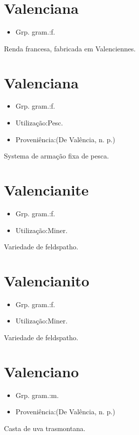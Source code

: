 \documentclass{article}
\begin{document}
\section{Valenciana}
\begin{itemize}
\item {Grp. gram.:f.}
\end{itemize}
Renda francesa, fabricada em Valenciennes.
\section{Valenciana}
\begin{itemize}
\item {Grp. gram.:f.}
\end{itemize}
\begin{itemize}
\item {Utilização:Pesc.}
\end{itemize}
\begin{itemize}
\item {Proveniência:(De \textunderscore Valência\textunderscore , n. p.)}
\end{itemize}
Systema de armação fixa de pesca.
\section{Valencianite}
\begin{itemize}
\item {Grp. gram.:f.}
\end{itemize}
\begin{itemize}
\item {Utilização:Miner.}
\end{itemize}
Variedade de feldspatho.
\section{Valencianito}
\begin{itemize}
\item {Grp. gram.:f.}
\end{itemize}
\begin{itemize}
\item {Utilização:Miner.}
\end{itemize}
Variedade de feldspatho.
\section{Valenciano}
\begin{itemize}
\item {Grp. gram.:m.}
\end{itemize}
\begin{itemize}
\item {Proveniência:(De \textunderscore Valência\textunderscore , n. p.)}
\end{itemize}
Casta de uva trasmontana.
\end{document}
